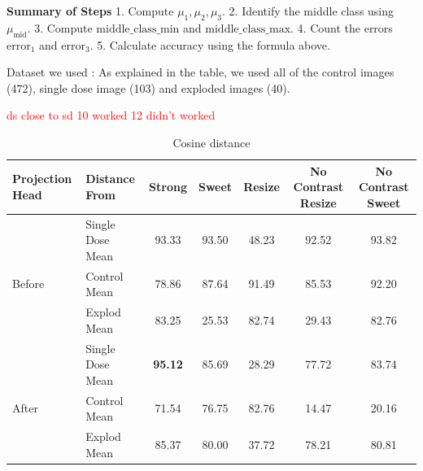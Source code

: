 \textbf{Summary of Steps}
1. Compute \( \mu_1, \mu_2, \mu_3 \).
2. Identify the middle class using \( \mu_{\text{mid}} \).
3. Compute \( \text{middle\_class\_min} \) and \( \text{middle\_class\_max} \).
4. Count the errors \( \text{error}_1 \) and \( \text{error}_3 \).
5. Calculate accuracy using the formula above.




Dataset we used : As explained in the table, we used all of the control images (472),
single dose image (103) and exploded images (40).

\textcolor{red}{ds close to sd 10 worked 12 didn't worked}



\begin{table}[H]
  \centering
  \begin{tabular}{@{}llccccc@{}}
  \toprule
  Projection Head & Distance From      & Strong & Sweet & Resize & No Contrast Resize & No Contrast Sweet \\ \midrule
                  & Single Dose Mean   & 93.33      & 93.50     & 48.23      & 92.52                  & 93.82                 \\
  Before          & Control Mean       & 78.86      & 87.64     & 91.49      & 85.53                  & 92.20                 \\
                  & Explod Mean        & 83.25      & 25.53     & 82.74      & 29.43                  & 82.76                 \\ \midrule
                  & Single Dose Mean   & \textbf{95.12}      & 85.69     & 28.29      & 77.72                  & 83.74                 \\
  After           & Control Mean       & 71.54      & 76.75     & 82.76      & 14.47                  & 20.16                 \\
                  & Explod Mean        & 85.37      & 80.00     & 37.72      & 78.21                  & 80.81                 \\ \bottomrule
  \end{tabular}
  \caption{Cosine distance}
  \label{tab:table_label}
\end{table}

